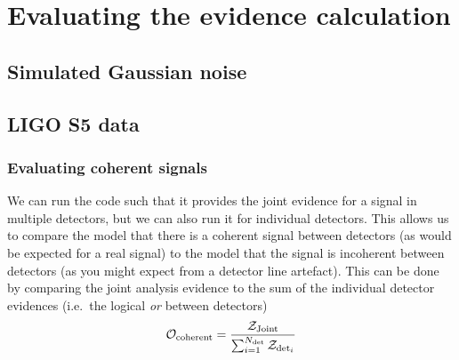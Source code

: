 \section{Evaluating the evidence calculation}

\subsection{Simulated Gaussian noise}

\subsection{LIGO S5 data}

\subsubsection{Evaluating coherent signals}

We can run the code such that it provides the joint evidence for a signal in multiple detectors, but we can
also run it for individual detectors. This allows us to compare the model that there is a coherent signal
between detectors (as would be expected for a real signal) to the model that the signal is incoherent between
detectors (as you might expect from a detector line artefact). This can be done by comparing the joint
analysis evidence to the sum of the individual detector evidences (i.e.\ the logical {\it or} between
detectors)
\begin{equation}
\mathcal{O}_{\rm coherent} = \frac{\mathcal{Z}_{\rm Joint}}{\sum_{i=1}^{N_{\rm det}} \mathcal{Z}_{{\rm det}_i}}
\end{equation}
